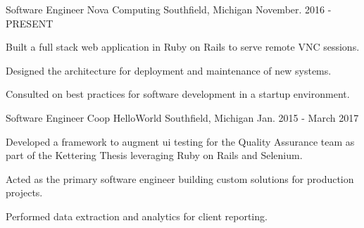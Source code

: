 
\begin{cventries}


  \cventry
    {Software Engineer} %
    {Nova Computing} %
    {Southfield, Michigan} %
    {November. 2016 - PRESENT} %
    {
      \begin{cvitems} %
        \item {Built a full stack web application in Ruby on Rails to serve remote VNC sessions.}
        \item {Designed the architecture for deployment and maintenance of new systems.}
	      \item {Consulted on best practices for software development in a startup environment.}
      \end{cvitems}
    }


  \cventry
    {Software Engineer Coop} %
    {HelloWorld} %
    {Southfield, Michigan} %
    {Jan. 2015 - March 2017} %
    {
      \begin{cvitems} %
        \item {Developed a framework to augment ui testing for the Quality Assurance
        team as part of the Kettering Thesis leveraging Ruby on Rails and Selenium.}
        \item {Acted as the primary software engineer building custom solutions for production projects.}
        \item {Performed data extraction and analytics for client reporting.}
      \end{cvitems}
    }


\end{cventries}
